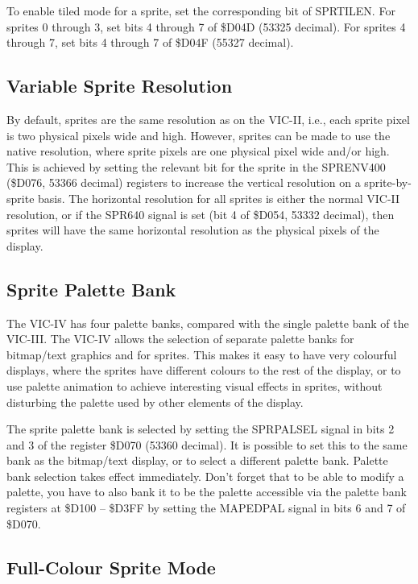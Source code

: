 To enable tiled mode for a sprite, set the corresponding bit of SPRTILEN. For sprites 0 through 3, set bits 4 through 7 of \$D04D (53325 decimal). For sprites 4 through 7, set bits 4 through 7 of \$D04F (55327 decimal).

\subsection{Variable Sprite Resolution}

By default, sprites are the same resolution as on the VIC-II, i.e., each sprite pixel is two physical pixels wide and high.
However, sprites can be made to use the native resolution, where sprite pixels are one physical pixel wide and/or high.
This is achieved by setting the relevant bit for the sprite in the SPRENV400 (\$D076, 53366 decimal) registers to increase the
vertical resolution on a sprite-by-sprite basis.  The horizontal resolution for all sprites is either the normal VIC-II resolution, or if the SPR640 signal
is set (bit 4 of \$D054, 53332 decimal), then sprites will have the same horizontal resolution as the physical pixels of the display.

\subsection{Sprite Palette Bank}

The VIC-IV has four palette banks, compared with the single palette bank of the VIC-III.
The VIC-IV allows the selection of separate palette banks for bitmap/text graphics and for sprites.  This makes it easy to have
very colourful displays, where the sprites have different colours to the rest of the display, or to use palette animation to achieve
interesting visual effects in sprites, without disturbing the palette used by other elements of the display.

The sprite palette bank is selected by setting the SPRPALSEL signal in bits 2 and 3 of the register \$D070 (53360 decimal).
It is possible to set this to the same bank as the bitmap/text display, or to select a different palette bank.
Palette bank selection takes effect immediately.  Don't forget that to be able to modify a palette, you have to also bank it
to be the palette accessible via the palette bank registers at \$D100 -- \$D3FF by setting the MAPEDPAL signal in bits 6 and 7 of
\$D070.

\subsection{Full-Colour Sprite Mode}

